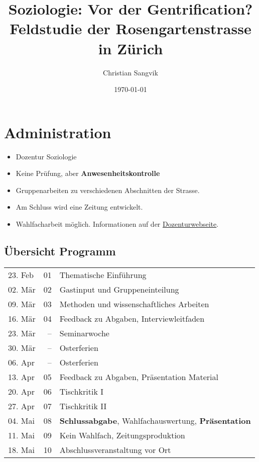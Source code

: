 \documentclass[a4paper,11pt,ngerman]{article}
\author{Christian Sangvik}
\date{\today}
\title{Soziologie: Vor der Gentrification? Feldstudie der Rosengartenstrasse in Zürich}
\begin{document}
\maketitle
\tableofcontents


\section{Administration}
\label{sec-1}

\begin{itemize}
\item Dozentur Soziologie
\item Keine Prüfung, aber \textbf{Anwesenheitskontrolle}
\item Gruppenarbeiten zu verschiedenen Abschnitten der Strasse.
\item Am Schluss wird eine Zeitung entwickelt.
\item Wahlfacharbeit möglich. Informationen auf der \href{http://www.soziologie.arch.ethz.ch/de/}{Dozenturwebseite}.
\end{itemize}

\subsection{Übersicht Programm}
\label{sec-1-1}

\begin{center}
\begin{tabular}{lrl}
23. Feb & 01 & Thematische Einführung\\
02. Mär & 02 & Gastinput und Gruppeneinteilung\\
09. Mär & 03 & Methoden und wissenschaftliches Arbeiten\\
16. Mär & 04 & Feedback zu Abgaben, Interviewleitfaden\\
23. Mär & -- & Seminarwoche\\
30. Mär & -- & Osterferien\\
06. Apr & -- & Osterferien\\
13. Apr & 05 & Feedback zu Abgaben, Präsentation Material\\
20. Apr & 06 & Tischkritik I\\
27. Apr & 07 & Tischkritik II\\
04. Mai & 08 & \textbf{Schlussabgabe}, Wahlfachauswertung, \textbf{Präsentation}\\
11. Mai & 09 & Kein Wahlfach, Zeitungsproduktion\\
18. Mai & 10 & Abschlussveranstaltung vor Ort\\
\end{tabular}
\end{center}
\end{document}
